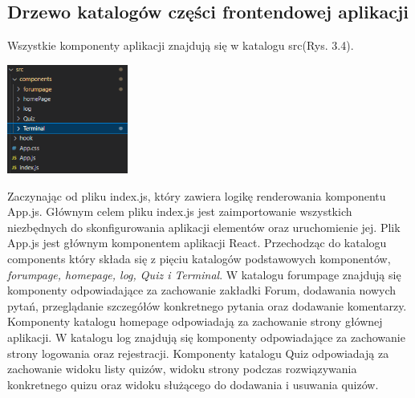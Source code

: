 \documentclass[10pt,a4paper]{report}
\begin{document}
\begin{adjustwidth}{2cm}{2cm}
\subsection{Drzewo katalogów części frontendowej aplikacji}
\begin{minipage}{1\linewidth}
Wszystkie komponenty aplikacji  znajdują się w katalogu src(Rys. 3.4).\\
\end{minipage}
 \begin{minipage}{\linewidth}
\begin{center}
  \includegraphics[width=150px]{code/drzewo.png}
\end{center}
\end{minipage}
\begin{minipage}{1\linewidth}
\vspace{0.3cm}
Zaczynając od pliku index.js, który zawiera logikę renderowania komponentu App.js. Głównym celem pliku index.js jest zaimportowanie wszystkich niezbędnych do skonfigurowania aplikacji elementów oraz uruchomienie jej. Plik App.js jest głównym komponentem aplikacji React. Przechodząc do katalogu components który składa się z pięciu katalogów podstawowych komponentów, \textit{forumpage, homepage, log, Quiz i Terminal}. W katalogu forumpage znajdują się komponenty odpowiadające za zachowanie zakładki Forum, dodawania nowych pytań, przeglądanie szczegółów konkretnego pytania oraz dodawanie komentarzy. Komponenty katalogu homepage odpowiadają za zachowanie strony głównej aplikacji. W katalogu log znajdują się komponenty odpowiadające za zachowanie strony logowania oraz rejestracji. Komponenty katalogu Quiz odpowiadają za zachowanie widoku listy quizów, widoku strony podczas rozwiązywania konkretnego quizu oraz widoku służącego do dodawania i usuwania quizów. 
\vspace{-0.1cm}
\end{minipage}
\begin{multicols}{2}
\begin{minipage}{\linewidth}
\begin{center}

\end{center}
\end{minipage}
\end{multicols}
\end{adjustwidth}
\end{document}
